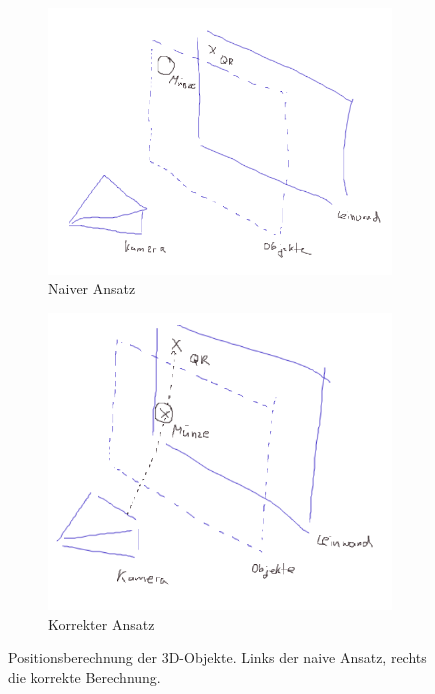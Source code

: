 \begin{figure}[!h]
  \centering
    \begin{subfigure}{0.42\textwidth}
      \centering
        \includegraphics[width=\textwidth]{position_skizze_falsch}
      \caption{Naiver Ansatz}
    \end{subfigure}%
    \begin{subfigure}{0.42\textwidth}
      \centering
        \includegraphics[width=\textwidth]{position_skizze_richtig}
      \caption{Korrekter Ansatz}
    \end{subfigure}
    \caption[Positionsberechnung der 3D-Objekte]{Positionsberechnung der 3D-Objekte. Links der naive Ansatz, rechts die korrekte Berechnung.}
    \label{fig:position_sketch}
\end{figure}

